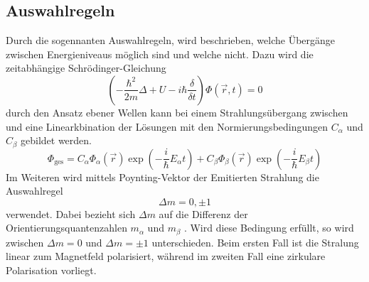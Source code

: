 \subsection{Auswahlregeln}
\label{sec:Auswahlregeln}
Durch die sogennanten Auswahlregeln, wird beschrieben, welche Übergänge zwischen
Energieniveaus möglich sind und welche nicht. Dazu wird die zeitabhängige
Schrödinger-Gleichung
\begin{equation}
  \left( -\frac{\hbar^2}{2m}\Delta+U-i\hbar \frac{\delta}{\delta t} \right)\Phi\left(\vec{r}, t \right) = 0
  \label{eqn:schroedinger}
\end{equation}
durch den Ansatz ebener Wellen kann bei einem Strahlungsübergang zwischen \alpha
und \beta eine Linearkbination der Lösungen mit den Normierungsbedingungen $C_\alpha$
und $C_\beta$ gebildet werden.
\begin{equation}
  \Phi_\text{ges} = C_\alpha \Phi_\alpha\left(\vec{r}\right)\exp{\left(-\frac{i}{\hbar}E_\alpha t\right)} + C_\beta \Phi_\beta\left(\vec{r}\right)\exp{\left(-\frac{i}{\hbar}E_\beta t\right)}
  \label{eqn:ebenewelle}
\end{equation}
Im Weiteren wird mittels Poynting-Vektor der Emitierten Strahlung die Auswahlregel
\begin{equation}
  \Delta m = 0, \pm 1
  \label{eqn:auswahl}
\end{equation}
verwendet. Dabei bezieht sich $\Delta m$ auf die Differenz der Orientierungsquantenzahlen
$m_\alpha$ und $m_\beta$ . Wird diese Bedingung erfüllt, so wird zwischen $\Delta m = 0$
und $\Delta m = \pm 1$ unterschieden. Beim ersten Fall ist die Stralung linear zum
Magnetfeld polarisiert, während im zweiten Fall eine zirkulare Polarisation vorliegt.


